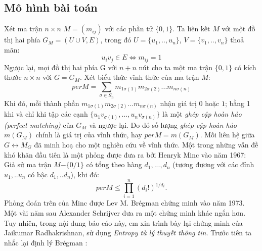 \documentclass[a4paper, 12pt]{report}
\newtheorem*{theorem}{Định lý } %
\begin{document}
\subsection*{Mô hình bài toán}
Xét ma trận $n \times n$ $M =( m_{ij}) $ với các phần tử $\{0,1\}$. Ta liên kết $M$ với một đồ thị hai phía $G_{M} = (U \cup V ,E)$, trong đó $U=\{u_{1},..,u_{n}\}$, $V=\{v_{1},..,v_{n}\}$ thoả mãn: 
\begin{equation*}
    u_{i}v_{j} \in E \Longleftrightarrow m_{ij}=1
\end{equation*}
Ngược lại, mọi đồ thị hai phía G với $n+n$ nút cho ta một ma trận $\{0,1\}$ có kích thước $n \times n$ với $G=G_M$. Xét biểu thức vĩnh thức của ma trận $M$:
\begin{equation*}
	per M = \displaystyle \sum_{\sigma \in S_{n}}m_{1\sigma(1)}m_{2\sigma(2)}...m_{n\sigma(n)}
\end{equation*}
Khi đó, mỗi thành phần $m_{1\sigma(1)}m_{2\sigma(2)}...m_{n\sigma(n)}$ nhận giá trị $0$ hoặc $1$; bằng 1 khi và chỉ khi tập các cạnh $\{u_{1}v_{\sigma(1)},...,u_{n}v_{\sigma(n)}\}$ là một \textit{ghép cặp hoàn hảo (perfect matching)} của $G_M$ và ngược lại. Do đó số lượng \textit{ghép cặp hoàn hảo} $m(G_M)$ chính là giá trị của vĩnh thức, hay $per M = m(G_M)$.
Mối liên hệ giữa $G \leftrightarrow M_G$ đã minh hoạ cho một nghiên cứu về vĩnh thức. Một trong những vẫn đề khó khăn đầu tiên là một phỏng được đưa ra bởi Henryk Minc vào năm 1967: Giả sử ma trận $M$$-\{0/1\}$ có tổng theo hàng $d_1,...,d_n$ (tương đương với các đỉnh $u_1,..u_n$ có bậc $d_1,..d_n$), khi đó:
\begin{equation*}
    per M \leq \prod_{i=1}^{n}(d_{i}!)^{1/d_{i}}.
\end{equation*}
Phỏng đoán trên của Minc được Lev M. Brégman chứng minh vào năm 1973. Một vài năm sau Alexander Schrijver đưa ra một chứng minh khác ngắn hơn. Tuy nhiên, trong nội dung báo cáo này, em xin trình bày lại chứng minh của Jaikumar Radhakrishnan, sử dụng \textit{Entropy từ lý thuyết thông tin.} Trước tiên ta nhắc lại định lý Brégman :

%
\end{document}
